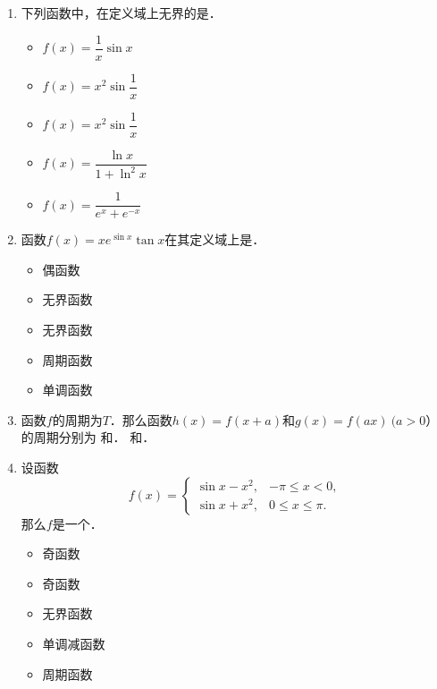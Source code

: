 \begin{enumerate}
\item 下列函数中，在定义域上无界的是\uline{\makebox[4em]{}}．
  \begin{itemize}
    \renewcommand{\labelitemi}{\faCircleThin}
  \item \(f(x) = \dfrac1x \sin x\)
    \ifshowsol
  \item[\faCircle] \(f(x) = x^2 \sin \dfrac1x\)
    \else
  \item \(f(x) = x^2 \sin \dfrac1x\)
    \fi
  \item \(f(x) = \dfrac{\ln x}{1 + \ln^2 x}\)
  \item \(f(x) = \dfrac1{e^x + e^{-x}}\)
  \end{itemize}

\item 函数\(f(x) = x e^{\sin x} \tan x\)在其定义域上是\uline{\makebox[3em]{}}．
  \begin{itemize}
    \renewcommand{\labelitemi}{\faCircleThin}
  \item 偶函数
    \ifshowsol
  \item[\faCircle] 无界函数
    \else
  \item 无界函数
    \fi
  \item 周期函数
  \item 单调函数
  \end{itemize}

\item 函数\(f\)的周期为\(T\)．那么函数\(h(x) = f(x+a)\)和\(g(x) = f(ax)\ (a > 0）\)的周期分别为
  \ifshowsol
  \uline{}和\uline{}．
  \else
  \uline{\makebox[3em]{}}和\uline{\makebox[3em]{}}．
  \fi

\item 设函数
  \[
    f(x) =
    \begin{cases}
      \sin x - x^2, & -\pi \le x < 0, \\
      \sin x + x^2, & 0 \le x \le \pi.
    \end{cases}
  \]
  那么\(f\)是一个\uline{\makebox[4em]{}}．
  \begin{itemize}
    \renewcommand{\labelitemi}{\faCircleThin}
    \ifshowsol
  \item[\faCircle] 奇函数
    \else
  \item 奇函数
    \fi
  \item 无界函数
  \item 单调减函数
  \item 周期函数
  \end{itemize}


\end{enumerate}
